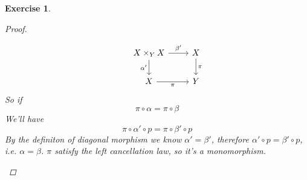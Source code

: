 \documentclass{article}
\theoremstyle{breakstyle}
\newtheorem{exercise}{Exercise}[section]
\begin{document}
\begin{exercise}
\begin{proof}
\begin{itemize}
$$\begin{tikzcd}
                                                                                              & X\times_YX \arrow[d, "\alpha'"'] \arrow[r, "\beta'"] & X \arrow[d, "\pi"] \\
                                                                                              & X \arrow[r, "\pi"']                                  & Y                 
    \end{tikzcd}
    $$ 
    So if
    $$
    \pi\circ \alpha=\pi\circ \beta
    $$ 
    We'll have
    $$
    \pi\circ \alpha'\circ p=\pi\circ \beta'\circ p
    $$ 
    By the definiton of diagonal morphism we know $\alpha'=\beta'$, therefore
    $\alpha'\circ p=\beta'\circ p$, i.e. $\alpha=\beta$. $\pi$ satisfy the left
    cancellation law, so it's a monomorphism.
	\end{itemize}
\end{proof}

\end{exercise}
\end{document}
